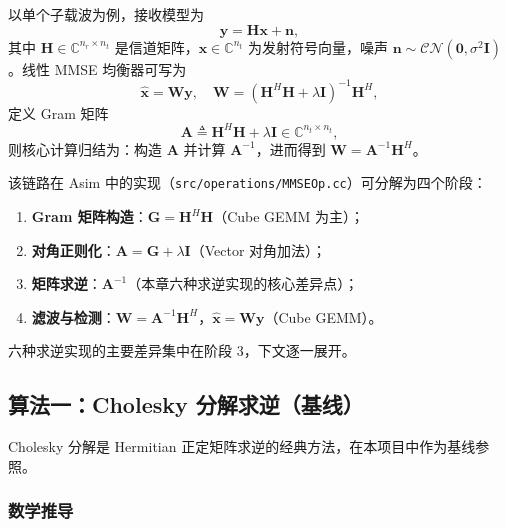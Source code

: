 \documentclass{CjC}
\begin{document}
    以单个子载波为例，接收模型为
    \begin{equation}
        \bm{y}= \bm{H}\bm{x}+ \bm{n},
    \end{equation}
    其中 $\bm{H}\in\mathbb{C}^{n_r\times n_t}$ 是信道矩阵，$\bm{x}\in\mathbb{C}^{n_t}$
    为发射符号向量，噪声 $\bm{n}\sim\mathcal{CN}(\bm{0},\sigma^{2}\bm{I})$。线性
    MMSE 均衡器可写为
    \begin{equation}
        \hat{\bm{x}}= \bm{W}\bm{y},\quad \bm{W}= \left(\bm{H}^{H}\bm{H}+ \lambda\bm
        {I}\right)^{-1}\bm{H}^{H},
    \end{equation}
    定义 Gram 矩阵
    \begin{equation}
        \bm{A}\triangleq \bm{H}^{H}\bm{H}+ \lambda\bm{I}\in\mathbb{C}^{n_t\times
        n_t},
    \end{equation}
    则核心计算归结为：构造 $\bm{A}$ 并计算 $\bm{A}^{-1}$，进而得到
    $\bm{W}=\bm{A}^{-1}\bm{H}^{H}$。

    该链路在 Asim 中的实现（\texttt{src/operations/MMSEOp.cc}）可分解为四个阶段：
    \begin{enumerate}
        \item \textbf{Gram 矩阵构造}：$\bm{G}=\bm{H}^{H}\bm{H}$（Cube GEMM 为主）；

        \item \textbf{对角正则化}：$\bm{A}=\bm{G}+\lambda\bm{I}$（Vector 对角加法）；

        \item \textbf{矩阵求逆}：$\bm{A}^{-1}$（本章六种求逆实现的核心差异点）；

        \item \textbf{滤波与检测}：$\bm{W}=\bm{A}^{-1}\bm{H}^{H}$，$\hat{\bm{x}}=
            \bm{W}\bm{y}$（Cube GEMM）。
    \end{enumerate}

    六种求逆实现的主要差异集中在阶段 3，下文逐一展开。

    \subsection{算法一：Cholesky 分解求逆（基线）}
    \label{sec:cholesky}

    Cholesky 分解是 Hermitian 正定矩阵求逆的经典方法，在本项目中作为基线参照。

    \subsubsection{数学推导}
\end{document}
